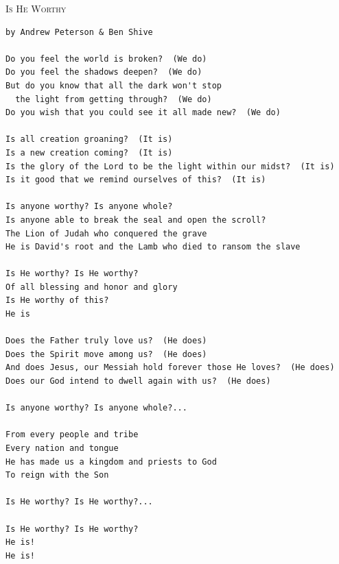 \documentclass[10pt,oneside,footinclude=true,headinclude=true]{scrbook} %
\newcommand\songtitle[1]{
	\hspace*{-3.7mm}\Large\textsc{#1}
}
\begin{document}
\bigskip
\medskip
\songtitle{Is He Worthy}
\begin{verbatim}
by Andrew Peterson & Ben Shive

Do you feel the world is broken?  (We do)
Do you feel the shadows deepen?  (We do)
But do you know that all the dark won't stop
  the light from getting through?  (We do)
Do you wish that you could see it all made new?  (We do)

Is all creation groaning?  (It is)
Is a new creation coming?  (It is)
Is the glory of the Lord to be the light within our midst?  (It is)
Is it good that we remind ourselves of this?  (It is)

Is anyone worthy? Is anyone whole?
Is anyone able to break the seal and open the scroll?
The Lion of Judah who conquered the grave
He is David's root and the Lamb who died to ransom the slave

Is He worthy? Is He worthy?
Of all blessing and honor and glory
Is He worthy of this?
He is

Does the Father truly love us?  (He does)
Does the Spirit move among us?  (He does)
And does Jesus, our Messiah hold forever those He loves?  (He does)
Does our God intend to dwell again with us?  (He does)

Is anyone worthy? Is anyone whole?...

From every people and tribe
Every nation and tongue
He has made us a kingdom and priests to God
To reign with the Son

Is He worthy? Is He worthy?...

Is He worthy? Is He worthy?
He is!
He is!
\end{verbatim}

\end{document}
